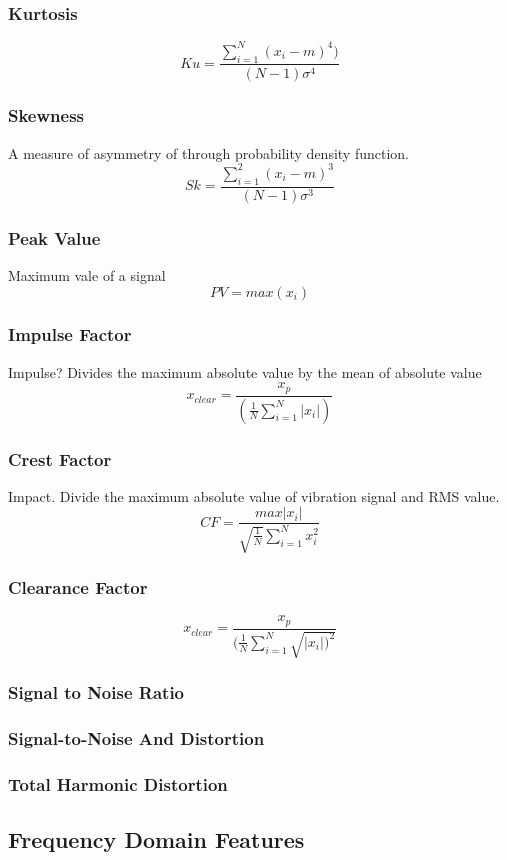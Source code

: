 \documentclass{article}
\begin{document}
\subsubsection{Kurtosis}

$$ Ku = \frac{\sum^N_{i=1}(x_i-m)^4)}{(N-1)\sigma^4} $$ 
\subsubsection{Skewness} 
A measure of asymmetry of through probability density function.
$$ Sk = \frac{\sum^2_{i=1}(x_i-m)^3}{(N-1)\sigma^3} $$
\subsubsection{Peak Value}
Maximum vale of a signal
$$ PV = max(x_i) $$ 
\subsubsection{Impulse Factor} 
Impulse? Divides the maximum absolute value by the mean of absolute value
$$ x_{clear} = \frac{x_p}{(\frac{1}{N}\sum^N_{i=1}|x_i|)} $$  
\subsubsection{Crest Factor} 
Impact. Divide the maximum absolute value of vibration signal and
RMS value.
$$ CF = \frac{max|x_i|}{\sqrt{\frac{1}{N}}\sum^N_{i=1}x^2_i} $$
\subsubsection{Clearance Factor} 

$$ x_{clear} = \frac{x_p}{(\frac{1}{N}\sum^N_{i=1}\sqrt{|x_i|)^2}} $$
\subsubsection{Signal to Noise Ratio}

\subsubsection{Signal-to-Noise And Distortion}

\subsubsection{Total Harmonic Distortion}
   
\subsection{Frequency Domain Features}
\end{document}
